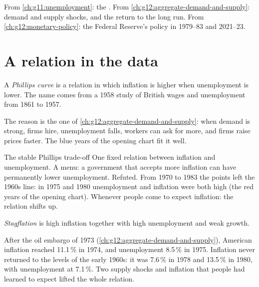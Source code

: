 \begin{recall}
From \cref{ch:g11:unemployment}: the . From \cref{ch:g12:aggregate-demand-and-supply}: demand and supply shocks, and the return to the long
run. From \cref{ch:g12:monetary-policy}: the Federal Reserve's policy in 1979--83 and 2021--23.
\end{recall}

\section{A relation in the data}\label{sec:g12:phillips-curve:relation}

\begin{definition}\label{def:g12:phillips-curve:phillips-curve}
A \emph{Phillips curve} is a relation in which inflation is higher when unemployment is lower. The name comes from a 1958 study of British wages and
unemployment from 1861 to 1957.
\end{definition}

The reason is the one of \cref{ch:g12:aggregate-demand-and-supply}: when demand is strong, firms hire, unemployment falls, workers can ask for more, and firms raise prices
faster. The blue years of the opening chart fit it well.

\begin{model}{The stable Phillips trade-off}
\assumes One fixed relation between inflation and unemployment.
\predicts A menu: a government that accepts more inflation can have permanently lower unemployment.
\tested Refuted. From 1970 to 1983 the points left the 1960s line: in 1975 and 1980 unemployment and inflation were both high (the red years of the opening chart).
\breaks Whenever people come to expect inflation: the relation shifts up.
\end{model}

\begin{definition}[Stagflation]\label{def:g12:phillips-curve:stagflation}
\emph{Stagflation} is high inflation together with high unemployment and weak growth.
\end{definition}

\begin{record}[Stagflation, 1973--82]
After the oil embargo of 1973 (\cref{ch:g12:aggregate-demand-and-supply}), American inflation reached 11.1\,\% in 1974, and unemployment 8.5\,\% in 1975. Inflation never
returned to the levels of the early 1960s: it was 7.6\,\% in 1978 and 13.5\,\% in 1980, with unemployment at 7.1\,\%. Two supply shocks and inflation that people had learned
to expect lifted the whole relation.
\end{record}

